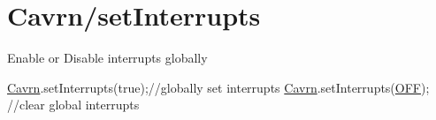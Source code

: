 \hypertarget{a00002}{\section{Cavrn/set\-Interrupts}
}
Enable or Disable interrupts globally 
\begin{DoxyCode}
\hyperlink{a00005}{Cavrn}.setInterrupts(\textcolor{keyword}{true});\textcolor{comment}{//globally set interrupts}
\hyperlink{a00005}{Cavrn}.setInterrupts(\hyperlink{a00011_a29e413f6725b2ba32d165ffaa35b01e5}{OFF}); \textcolor{comment}{//clear global interrupts }
\end{DoxyCode}



\begin{DoxyCodeInclude}
\end{DoxyCodeInclude}
 